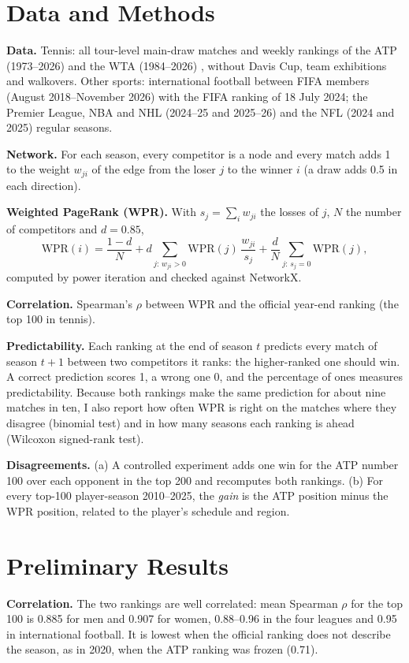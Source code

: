 \documentclass[10pt,twocolumn]{article}
\begin{document}
\section{Data and Methods}
\textbf{Data.} Tennis: all tour-level main-draw matches and weekly rankings of the ATP (1973--2026) and the WTA (1984--2026) \cite{sackmann}, without Davis Cup, team exhibitions and walkovers. Other sports: international football between FIFA members (August 2018--November 2026) with the FIFA ranking of 18 July 2024; the Premier League, NBA and NHL (2024--25 and 2025--26) and the NFL (2024 and 2025) regular seasons.

\textbf{Network.} For each season, every competitor is a node and every match adds 1 to the weight $w_{ji}$ of the edge from the loser $j$ to the winner $i$ (a draw adds 0.5 in each direction).

\textbf{Weighted PageRank (WPR).} With $s_j=\sum_i w_{ji}$ the losses of $j$, $N$ the number of competitors and $d=0.85$,
\begin{equation*}
\mathrm{WPR}(i)=\frac{1-d}{N}+d\!\!\sum_{j:\,w_{ji}>0}\!\!\mathrm{WPR}(j)\,\frac{w_{ji}}{s_j}+\frac{d}{N}\!\!\sum_{j:\,s_j=0}\!\!\mathrm{WPR}(j),
\end{equation*}
computed by power iteration and checked against NetworkX.

\textbf{Correlation.} Spearman's $\rho$ between WPR and the official year-end ranking (the top 100 in tennis).

\textbf{Predictability.} Each ranking at the end of season $t$ predicts every match of season $t+1$ between two competitors it ranks: the higher-ranked one should win. A correct prediction scores 1, a wrong one 0, and the percentage of ones measures predictability. Because both rankings make the same prediction for about nine matches in ten, I also report how often WPR is right on the matches where they disagree (binomial test) and in how many seasons each ranking is ahead (Wilcoxon signed-rank test).

\textbf{Disagreements.} (a) A controlled experiment adds one win for the ATP number 100 over each opponent in the top 200 and recomputes both rankings. (b) For every top-100 player-season 2010--2025, the \emph{gain} is the ATP position minus the WPR position, related to the player's schedule and region.

\section{Preliminary Results}
\textbf{Correlation.} The two rankings are well correlated: mean Spearman $\rho$ for the top 100 is 0.885 for men and 0.907 for women, 0.88--0.96 in the four leagues and 0.95 in international football. It is lowest when the official ranking does not describe the season, as in 2020, when the ATP ranking was frozen (0.71).
\end{document}
